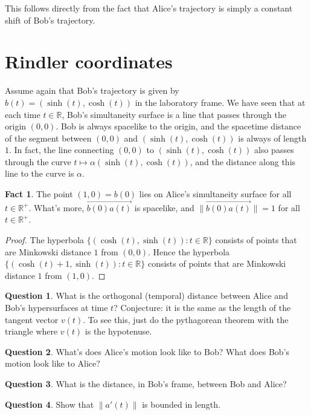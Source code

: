 \documentclass[tikz,border=10pt,fleqn]{article}
\theoremstyle{definition}
\newtheorem*{question}{Question}
\newtheorem*{fact}{Fact}
\newcommand{\vecc}[1]{\overrightarrow{#1}}
\begin{document}
This follows directly from the fact that Alice's trajectory is simply
a constant shift of Bob's trajectory.

\section{Rindler coordinates}

Assume again that Bob's trajectory is given by
$b(t)=(\sinh (t),\cosh (t))$ in the laboratory frame. We have seen
that at each time $t\in\mathbb{R}$, Bob's simultaneity surface is a
line that passes through the origin $(0,0)$. Bob is always spacelike
to the origin, and the spacetime distance of the segment between
$(0,0)$ and $(\sinh(t) ,\cosh (t))$ is always of length $1$. In fact,
the line connecting $(0,0)$ to $(\sinh (t),\cosh (t))$ also passes
through the curve $t\mapsto \alpha (\sinh (t),\cosh (t))$, and the
distance along this line to the curve is $\alpha$.

\begin{fact} The point $(1,0)=b(0)$ lies on Alice's simultaneity
  surface for all $t\in\mathbb{R}^+$. What's more, $\vecc{b(0)a(t)}$
  is spacelike, and $\| \vecc{b(0)a(t)}\| =1$ for all
  $t\in\mathbb{R}^+$. \end{fact}

\begin{proof} The hyperbola
  $\{ (\cosh (t),\sinh(t)):t\in\mathbb{R} \}$ consists of points that
  are Minkowski distance $1$ from $(0,0)$. Hence the hyperbola
  $\{ (\cosh (t)+1,\sinh (t)):t\in\mathbb{R}\}$ consists of points
  that are Minkowski distance $1$ from $(1,0)$.
\end{proof}


\begin{question} What is the orthogonal (temporal) distance between
  Alice and Bob's hypersurfaces at time $t$? Conjecture: it is the
  same as the length of the tangent vector $v(t)$. To see this, just
  do the pythagorean theorem with the triangle where $v(t)$ is the
  hypotenuse. \end{question}

\begin{question} What's does Alice's motion look like to Bob? What
  does Bob's motion look like to Alice? \end{question}

\begin{question} What is the distance, in Bob's frame, between Bob and
  Alice? \end{question}

\begin{question} Show that $\| a'(t)\|$ is bounded in
  length. \end{question}

\printbibliography 
\end{document}
